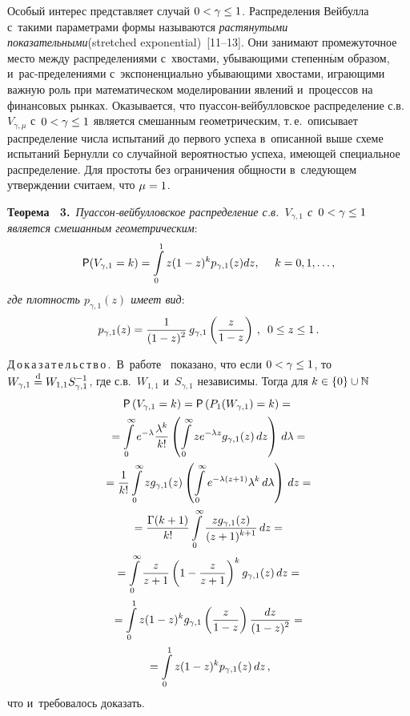\begin{multicols}{2}
\smallskip

Особый интерес представляет случай $0\hm<\gamma\hm\le1$. Распределения
Вейбулла с~такими па\-ра\-мет\-ра\-ми формы называются \textit{растянутыми
пока\-зательными}\linebreak (stretched exponential)~[11--13]. 
Они занимают промежуточное
место между распределениями с~хвос\-та\-ми, убывающими степенн$\acute{\mbox{ы}}$м
образом, и~рас-\linebreak пределениями с~экспоненциально убывающими хвос\-та\-ми,
играющими важную роль при математическом моделировании явлений 
и~процессов на финансовых рынках. Оказывается, что
пу\-ас\-сон-вей\-бул\-лов\-ское распределение с.в.~$V_{\gamma,\mu}$ 
с~$0\hm<\gamma\hm\le1$ является смешанным геометрическим, т.\,е.\ описывает
распределение числа испытаний до первого успеха в~описанной выше
схеме испытаний Бернулли со случайной вероятностью успеха, име\-ющей
специальное распределение. Для простоты без ограничения общности 
в~следующем утверждении считаем, что $\mu\hm=1$.

\smallskip

\noindent
\textbf{Теорема~ 3.}\ \textit{Пуас\-сон-вей\-бул\-лов\-ское распределение 
с.в.~$V_{\gamma,1}$ с~$0\hm<\gamma\hm\le1$ является смешанным гео\-мет\-ри\-че\-ским}:
$$
{\sf P}(V_{\gamma,1}=k)= 
\int\limits_{0}^{1}z(1-z)^kp_{\gamma,1}(z)dz,\ \ \ \ k=0,1,\ldots,
$$
\textit{где плотность $p_{\gamma,1}(z)$ имеет вид}:
$$
p_{\gamma,1}(z)=\displaystyle\frac{\displaystyle 1\mathstrut}{\displaystyle (1-z)^{2}\mathstrut}\,g_{\gamma,1}\left(\displaystyle\frac{\displaystyle z\mathstrut}{\displaystyle 1-z\mathstrut}\right)\,,\enskip
0\le z\le1\,.
$$


\noindent
Д\,о\,к\,а\,з\,а\,т\,е\,л\,ь\,с\,т\,в\,о\,.\ 
В~работе~\cite{Korolev2016Weibull} показано,
что если $0\hm<\gamma\hm\le1$, то $W_{\gamma,1}\stackrel{\mathrm{d}}{=} W_{1,1}S_{\gamma,1}^{-1}$, 
где с.в.~$W_{1,1}$ и~$S_{\gamma,1}$
независимы. Тогда для $k\hm\in\{0\}\cup\mathbb{N}$
\begin{multline*}
{\sf P}\left(V_{\gamma,1}=k\right)={\sf P}
\left(P_1(W_{\gamma,1})=k\right)={}\\[1pt]
{}=\int\limits_{0}^{\infty}e^{-\lambda}
\displaystyle\frac{\displaystyle \lambda^k\mathstrut}{\displaystyle k!\mathstrut}\left(\int\limits_{0}^{\infty} ze^{-\lambda z}
g_{\gamma,1}(z)\,dz\right)\,d\lambda={}
\\[1pt]
{}=\displaystyle\frac{\displaystyle 1\mathstrut}{\displaystyle k!\mathstrut}\int\limits_{0}^{\infty}
zg_{\gamma,1}(z)\left(
\int\limits_{0}^{\infty}e^{-\lambda(z+1)}\lambda^k\,d\lambda\right)\,dz={}\\[1pt]
{}=
\displaystyle\frac{\displaystyle \Gamma(k+1)\mathstrut}{\displaystyle k!\mathstrut}\int\limits_{0}^{\infty}\displaystyle\frac{\displaystyle zg_{\gamma,1}(z)\mathstrut}{\displaystyle (z+1)^{k+1}\mathstrut}\,dz={}
\\[1pt]
{}=\int\limits_{0}^{\infty}\displaystyle\frac{\displaystyle z\mathstrut}{\displaystyle z+1\mathstrut}\left(1-\displaystyle\frac{\displaystyle z\mathstrut}{\displaystyle z+1\mathstrut}\right)^kg_{\gamma,1}(z)\,dz={}\\[1pt]
{}=
\int\limits_{0}^{1}z(1-z)^k g_{\gamma,1}\left(
\displaystyle\frac{\displaystyle z\mathstrut}{\displaystyle 1-z\mathstrut}\right)\displaystyle\frac{\displaystyle dz\mathstrut}{\displaystyle (1-z)^{2}\mathstrut}={}\\[1pt]
{}=\int\limits_{0}^{1}z(1-z)^kp_{\gamma,1}(z)\,dz\,,
\end{multline*}
что и~требовалось доказать.


\end{multicols}
